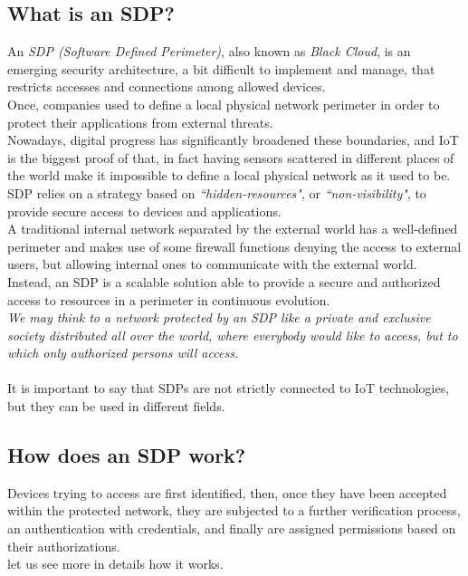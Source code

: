 \documentclass[12pt]{report}
\begin{document}
{\subsection{What is an SDP?}
\bigskip
An \emph{SDP (Software Defined Perimeter)}, also known as \emph{Black Cloud}, is an emerging security architecture, a bit difficult to implement and manage, that restricts accesses and connections among allowed devices.\\
Once, companies used to define a local physical network perimeter in order to protect their applications from external threats.\\
Nowadays, digital progress has significantly broadened these boundaries, and IoT is the biggest proof of that, in fact having sensors scattered in different places of the world make it impossible to define a local physical network as it used to be.\\

SDP relies on a strategy based on \emph{``hidden-resources"}, or \emph{``non-visibility"}, to provide secure access to devices and applications.\\
A traditional internal network separated by the external world has a well-defined perimeter and makes use of some firewall functions denying the access to external users, but allowing internal ones to communicate with the external world.\\
Instead, an SDP is a scalable solution able to provide a secure and authorized access to resources in a perimeter in continuous evolution.\\

\emph{We may think to a network protected by an SDP like a private and exclusive society distributed all over the world, where everybody would like to access, but to which only authorized persons will access.}~\cite{protectnetwithsdp}\\\\
It is important to say that SDPs are not strictly connected to IoT technologies, but they can be used in different fields.\\

\subsection{How does an SDP work?}
\bigskip

Devices trying to access are first identified, then, once they have been accepted within the protected network, they are subjected to a further verification process, an authentication with credentials, and finally are assigned permissions based on their authorizations.\\
let us see more in details how it works.\\

}
\end{document}
